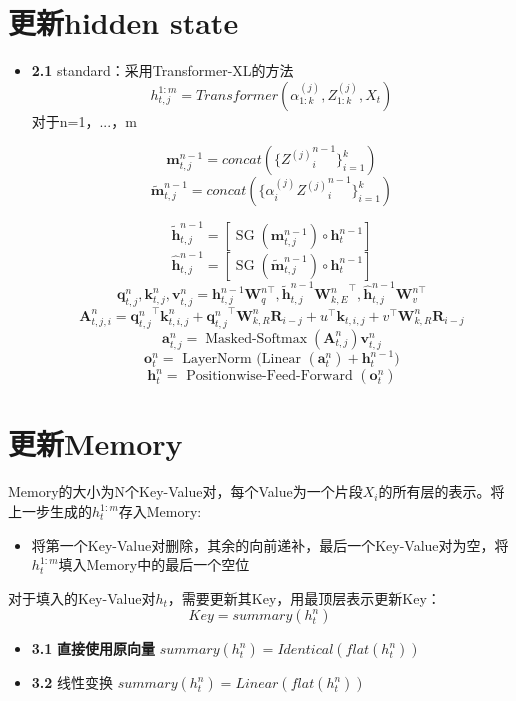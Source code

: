 \documentclass{article}
\begin{document}
\section{更新hidden state}
	\begin{itemize}
		\item \textbf{2.1} standard：采用Transformer-XL的方法
			$$h_{t,j}^{1:m} = Transformer(\alpha_{1:k}^{(j)},Z_{1:k}^{(j)}, X_t)$$ 
			对于n=1，...，m
			
	$$\textbf{m}_{t,j}^{n-1} = concat(\{{Z^{(j)}}_i^{n-1}\}_{i=1}^k)$$
	$$\tilde{\textbf{m}}_{t,j}^{n-1} = concat(\{\alpha_i^{(j)}{Z^{(j)}}_i^{n-1}\}_{i=1}^k) $$
			
$$\tilde{\mathbf{h}}_{t,j}^{n-1}=\left[\operatorname{SG}\left(\mathbf{m}_{t,j}^{n-1}\right) \circ \mathbf{h}_{t}^{n-1}\right]$$
$$\hat{\mathbf{h}}_{t,j}^{n-1}=\left[\operatorname{SG}\left(\tilde{\mathbf{m}}_{t,j}^{n-1}\right) \circ \mathbf{h}_{t}^{n-1}\right]$$
$$\mathbf{q}_{t,j}^{n}, \mathbf{k}_{t,j}^{n}, \mathbf{v}_{t,j}^{n}=\mathbf{h}_{t,j}^{n-1} \mathbf{W}_{q}^{n \top}, \tilde{\mathbf{h}}_{t,j}^{n-1} {\mathbf{W}_{k, E}^{n}}^{\top}, \hat{\mathbf{h}}_{t,j}^{n-1} \mathbf{W}_{v}^{n \top}$$
$$\mathbf{A}_{t, j, i}^{n}={\mathbf{q}_{t, j}^{n}}^{\top} \mathbf{k}_{t, i, j}^{n}+{\mathbf{q}_{t, j}^{n}}^{\top} \mathbf{W}_{k, R}^{n} \mathbf{R}_{i-j}+u^{\top} \mathbf{k}_{t, i, j}+v^{\top} \mathbf{W}_{k, R}^{n} \mathbf{R}_{i-j}$$
$$\mathbf{a}_{t,j}^{n}=\operatorname{Masked-Softmax}\left(\mathbf{A}_{t,j}^{n}\right) \mathbf{v}_{t,j}^{n}$$
$$\mathbf{o}_{t}^{n}=\text { LayerNorm (Linear }\left(\mathbf{a}_{t}^{n}\right)+\mathbf{h}_{t}^{n-1} )$$
$$\mathbf{h}_{t}^{n}=\text { Positionwise-Feed-Forward }\left(\mathbf{o}_{t}^{n}\right)$$


	\end{itemize}
\section{更新Memory}
	Memory的大小为N个Key-Value对，每个Value为一个片段$X_i$的所有层的表示。将上一步生成的$h_t^{1:m}$存入Memory:
	\begin{itemize}
		\item 将第一个Key-Value对删除，其余的向前递补，最后一个Key-Value对为空，将$h_t^{1:m}$填入Memory中的最后一个空位
	\end{itemize}
	对于填入的Key-Value对$h_t$，需要更新其Key，用最顶层表示更新Key：
	$$Key = summary(h_t^n)$$
	\begin{itemize}
		\item \textbf{3.1} \textbf{直接使用原向量} $summary(h_t^n) = Identical(flat(h_t^n))$
		\item \textbf{3.2} 线性变换 $summary(h_t^n) = Linear(flat(h_t^n))$
	\end{itemize}


\end{document}
